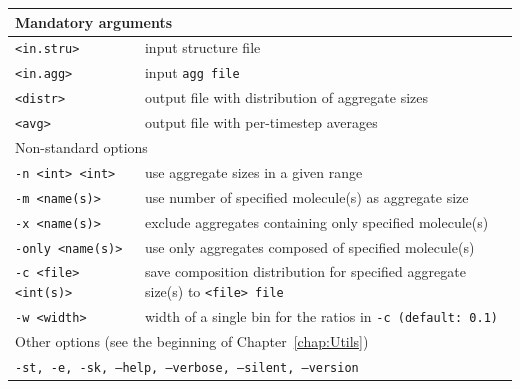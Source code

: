 \noindent
\begin{longtable}{p{}p{}}
  \toprule
  \multicolumn{2}{l}{Mandatory arguments}\\
  \midrule
  \tt{<in.stru>} & input structure file\\
  \tt{<in.agg>} & input \tt{agg} file\\
  \tt{<distr>} & output file with distribution of aggregate
    sizes \\
  \tt{<avg>} & output file with per-timestep averages\\
  \toprule
  \multicolumn{2}{l}{Non-standard options}\\
  \midrule
  \tt{-n <int> <int>} & use aggregate sizes in a given range\\
  \tt{-m <name(s)>} & use number of specified molecule(s) as aggregate
    size\\
  \tt{-x <name(s)>} & exclude aggregates containing only specified
    mole\-cule(s)\\
  \tt{-only <name(s)>} & use only aggregates composed of specified
  molecule(s)\\
  \tt{-c <file> <int(s)>} & save composition distribution for specified
    aggregate size(s) to \tt{<file>} file \\
  \tt{-w <width>} & width of a single bin for the ratios in \tt{-c}
    (default: 0.1)\\
  \midrule
  \multicolumn{2}{l}{Other options (see the beginning of
                     Chapter~\ref{chap:Utils})}\\
  \midrule
  \multicolumn{2}{l}{\tt{-st},
                     \tt{-e},
                     \tt{-sk},
                     \tt{--help},
                     \tt{--verbose},
                     \tt{--silent},
                     \tt{--version}}\\
  \bottomrule
\end{longtable}

